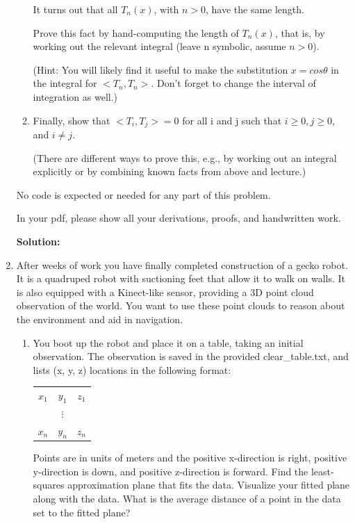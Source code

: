 \documentclass[conference,onecolumn]{IEEEtran}
\begin{document}
\begin{enumerate}[label=\arabic{enumi}.]
\begin{enumerate}
                        It turns out that all $T_n(x)$, with $n > 0$, have the same length.

                        Prove this fact by hand-computing the length of $T_n(x)$, that is, by working out the relevant integral (leave n symbolic, assume $n > 0$).

                        (Hint: You will likely find it useful to make the substitution $x = cos \theta$ in the integral for $< T_n, T_n >$. Don't forget to change the interval of integration as well.)
                  \item Finally, show that $< T_i, T_j > = 0$ for all i and j such that $i \geq 0, j \geq 0$, and $i \neq j$.

                        (There are different ways to prove this, e.g., by working out an integral explicitly or by combining known facts from above and lecture.)
            \end{enumerate}
            No code is expected or needed for any part of this problem.

            In your pdf, please show all your derivations, proofs, and handwritten work.

            \textbf{Solution:}



            \clearpage
      \item After weeks of work you have finally completed construction of a gecko robot.
            It is a quadruped robot with suctioning feet that allow it to walk on walls.
            It is also equipped with a Kinect-like sensor, providing a 3D point cloud observation of the world.
            You want to use these point clouds to reason about the environment and aid in navigation.
            \begin{enumerate}
                  \item You boot up the robot and place it on a table, taking an initial observation.
                        The observation is saved in the provided clear\_table.txt, and lists (x, y, z) locations in the following format:
                        \begin{table}[H]
                              \centering
                              \begin{tabular}{ccc}
                                    $x_1$ & $y_1$    & $z_1$ \\
                                          & $\vdots$ &       \\
                                    $x_n$ & $y_n$    & $z_n$
                              \end{tabular}
                        \end{table}
                        Points are in units of meters and the positive x-direction is right, positive y-direction is down, and positive z-direction is forward.
                        Find the least-squares approximation plane that fits the data.
                        Visualize your fitted plane along with the data.
                        What is the average distance of a point in the data set to the fitted plane?


\end{enumerate}
\end{enumerate}
\end{document}
